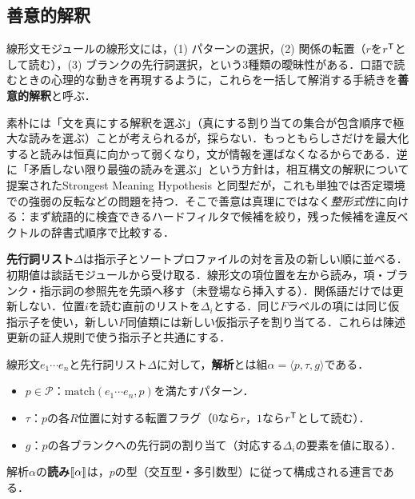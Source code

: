 \documentclass[../../main-detail.tex]{subfiles}
\begin{document}
\subsection{善意的解釈}
線形文モジュールの線形文には，(1) パターンの選択，(2) 関係の転置（$r$を$r^{\mathsf{T}}$として読む），(3) ブランクの先行詞選択，という3種類の曖昧性がある．口語で読むときの心理的な動きを再現するように，これらを一括して解消する手続きを\textbf{善意的解釈}と呼ぶ．
\begin{whynot}
素朴には「文を真にする解釈を選ぶ」（真にする割り当ての集合が包含順序で極大な読みを選ぶ）ことが考えられるが，採らない．もっともらしさだけを最大化すると読みは恒真に向かって弱くなり，文が情報を運ばなくなるからである．逆に「矛盾しない限り最強の読みを選ぶ」という方針は，相互構文の解釈について提案されたStrongest Meaning Hypothesis \cite{smh}と同型だが，これも単独では否定環境での強弱の反転などの問題を持つ．そこで善意は真理にではなく\emph{整形式性}に向ける：まず統語的に検査できるハードフィルタで候補を絞り，残った候補を違反ベクトルの辞書式順序で比較する．
\end{whynot}

\begin{definition}[先行詞リストと走査]
    \textbf{先行詞リスト}$\Delta$は指示子とソートプロファイルの対を言及の新しい順に並べる．初期値は談話モジュールから受け取る．線形文の項位置を左から読み，項・ブランク・指示詞の参照先を先頭へ移す（未登場なら挿入する）．関係語だけでは更新しない．位置$i$を読む直前のリストを$\Delta_i$とする．同じ$F$ラベルの項には同じ仮指示子を使い，新しい$F$同値類には新しい仮指示子を割り当てる．これらは陳述更新の証人規則で使う指示子と共通にする．
\end{definition}

\begin{definition}[解析]
    線形文$e_1\cdots e_n$と先行詞リスト$\Delta$に対して，\textbf{解析}とは組$\alpha = \langle p, \tau, g\rangle$である．
    \begin{itemize}
        \item $p \in \mathcal P$：$\mathrm{match}(e_1\cdots e_n, p)$を満たすパターン．
        \item $\tau$：$p$の各$R$位置に対する転置フラグ（$0$なら$r$，$1$なら$r^{\mathsf{T}}$として読む）．
        \item $g$：$p$の各ブランクへの先行詞の割り当て（対応する$\Delta_i$の要素を値に取る）．
    \end{itemize}
    解析$\alpha$の\textbf{読み}$\llbracket\alpha\rrbracket$は，$p$の型（交互型・多引数型）に従って構成される連言である．
\end{definition}
\end{document}
